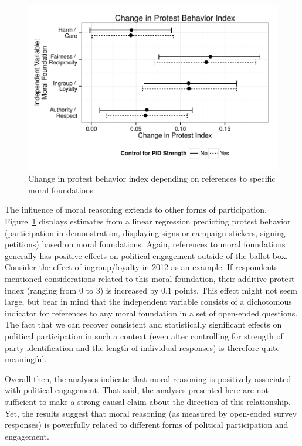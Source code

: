 \documentclass[12pt]{article}
\begin{document}
\begin{figure}[ht]\centering
\includegraphics{../calc/fig/fig6part.pdf}
\caption{Change in protest behavior index depending on references to specific moral foundations}\label{fig:6part}
\end{figure}

The influence of moral reasoning extends to other forms of participation. Figure~\ref{fig:6part} displays estimates from a linear regression predicting protest behavior (participation in demonstration, displaying signs or campaign stickers, signing petitions) based on moral foundations. Again, references to moral foundations generally has positive effects on political engagement outside of the ballot box. Consider the effect of ingroup/loyalty in 2012 as an example. If respondents mentioned considerations related to this moral foundation, their additive protest index (ranging from 0 to 3) is increased by 0.1 points. This effect might not seem large, but bear in mind that the independent variable consists of a dichotomous indicator for references to any moral foundation in a set of open-ended questions. The fact that we can recover consistent and statistically significant effects on political participation in such a context (even after controlling for strength of party identification and the length of individual responses) is therefore quite meaningful.

Overall then, the analyses indicate that moral reasoning is positively associated with political engagement. That said, the analyses presented here are not sufficient to make a strong causal claim about the direction of this relationship. Yet, the results suggest that moral reasoning (as measured by open-ended survey responses) is powerfully related to different forms of political participation and engagement.
\end{document}
